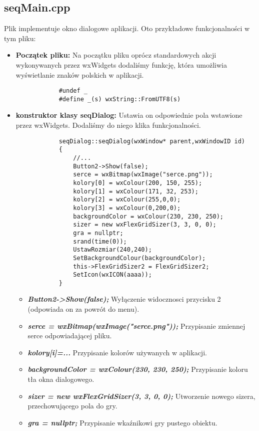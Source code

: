\documentclass[]{report}
\begin{document}
	\newpage
	
	\subsection*{seqMain.cpp}
	Plik implementuje okno dialogowe aplikacji. Oto przykładowe funkcjonalności w tym pliku:
	\begin{itemize}
		\item \textbf{Początek pliku:} Na początku pliku oprócz standardowych akcji wykonywanych przez wxWidgets dodaliśmy funkcję, która umożliwia wyświetlanie znaków polskich w aplikacji.
		\begin{lstlisting}
			#undef _
			#define _(s) wxString::FromUTF8(s)
		\end{lstlisting}
		\item \textbf{konstruktor klasy seqDialog:} Ustawia on odpowiednie pola wstawione przez wxWidgets. Dodaliśmy do niego klika funkcjonalności.
		\begin{lstlisting}
			seqDialog::seqDialog(wxWindow* parent,wxWindowID id)
			{
				//...
				Button2->Show(false);
				serce = wxBitmap(wxImage("serce.png"));
				kolory[0] = wxColour(200, 150, 255); 
				kolory[1] = wxColour(171, 32, 253); 
				kolory[2] = wxColour(255,0,0);
				kolory[3] = wxColour(0,200,0);
				backgroundColor = wxColour(230, 230, 250);
				sizer = new wxFlexGridSizer(3, 3, 0, 0);
				gra = nullptr;
				srand(time(0));
				UstawRozmiar(240,240);
				SetBackgroundColour(backgroundColor);
				this->FlexGridSizer2 = FlexGridSizer2;
				SetIcon(wxICON(aaaa));
			}
		\end{lstlisting}
		\begin{itemize}
			\item \textbf{\textit{Button2->Show(false);}} Wyłączenie widocznosci przycisku 2 (odpowiada on za powrót do menu).
			\item \textbf{\textit{serce = wxBitmap(wxImage("serce.png"));}} Przypisanie zmiennej serce odpowiadającej pliku.
			\item \textbf{\textit{kolory[i]=...}} Przypisanie kolorów używanych w aplikacji.
			\item \textbf{\textit{backgroundColor = wxColour(230, 230, 250);}} Przypisanie koloru tła okna dialogowego.
			\item \textbf{\textit{sizer = new wxFlexGridSizer(3, 3, 0, 0);}} Utworzenie nowego sizera, przechowującego pola do gry.
			\item \textbf{\textit{gra = nullptr;}} Przypisanie wkaźnikowi gry pustego obiektu.

\end{itemize}
\end{itemize}
\end{document}
